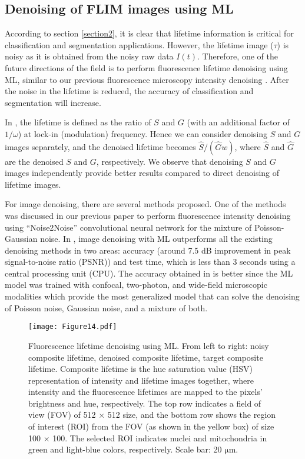 \documentclass[12pt]{iopart}
\begin{document}
\subsection{Denoising of FLIM images using ML} \label{denoising_lifetime}
According to section \ref{section2}, it is clear that lifetime information is critical for classification and segmentation applications. However, the lifetime image ($\tau$) is noisy as it is obtained from the noisy raw data $I(t)$. Therefore, one of the future directions of the field is to perform fluorescence lifetime denoising using ML, similar to our previous fluorescence microscopy intensity denoising \cite{cvpr}. After the noise in the lifetime is reduced, the accuracy of classification and segmentation will increase. 

In \cite{phasors}, the lifetime is defined as the ratio of $S$ and $G$ (with an additional factor of $1/\omega$) at lock-in (modulation) frequency. Hence we can consider denoising $S$ and $G$ images separately, and the denoised lifetime becomes $\hat{S}/(\hat{G}w)$, where $\hat{S}$ and $\hat{G}$ are the denoised $S$ and $G$, respectively. We observe that denoising $S$ and $G$ images independently provide better results compared to direct denoising of lifetime images.

For image denoising, there are several methods proposed. One of the methods was discussed in our previous paper \cite{cvpr} to perform fluorescence intensity denoising using \enquote{Noise2Noise} convolutional neural network for the mixture of Poisson-Gaussian noise. In \cite{cvpr}, image denoising with ML outperforms all the existing denoising methods in two areas: accuracy (around 7.5 dB improvement in peak signal-to-noise ratio (PSNR)) and test time, which is less than 3 seconds using a central processing unit (CPU). The accuracy obtained in \cite{cvpr} is better since the ML model was trained with confocal, two-photon, and wide-field microscopic modalities which provide the most generalized model that can solve the denoising of Poisson noise, Gaussian noise, and a mixture of both.

\begin{figure}[!t]
\centering
\texttt{[image: Figure14.pdf]}
\caption{Fluorescence lifetime denoising using ML. From left to right: noisy composite lifetime, denoised composite lifetime, target composite lifetime. Composite lifetime is the hue saturation value (HSV) representation of intensity and lifetime images together, where intensity and the fluorescence lifetimes are mapped to the pixels’ brightness and hue, respectively. The top row indicates a field of view (FOV) of 512 $\times$ 512 size, and the bottom row shows the region of interest (ROI) from the FOV (as shown in the yellow box) of size 100 $\times$ 100. The selected ROI indicates nuclei and mitochondria in green and light-blue colors, respectively. Scale bar: 20 $\mathrm{\mu}$m.}\label{pd_fig1}
\end{figure}
\end{document}
